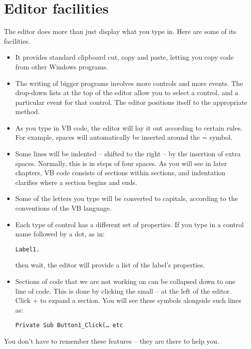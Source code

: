 	\section{Editor facilities}
		The editor does more than just display what you type in. Here are some of its facilities.
		\begin{itemize}
			\item It provides standard clipboard cut, copy and paste, letting you copy code from other Windows programs.
			\item The writing of bigger programs involves more controls and more events. The drop-down lists at the top of the editor allow you to select a control, and a particular event for that control. The editor positions itself to the appropriate method.
			\item As you type in VB code, the editor will lay it out according to certain rules. For example, spaces will automatically be inserted around the = symbol.
			\item Some lines will be indented – shifted to the right – by the insertion of extra spaces. Normally, this is in steps of four spaces. As you will see in later chapters, VB code consists of sections within sections, and indentation clarifies where a section begins and ends.
			\item Some of the letters you type will be converted to capitals, according to the conventions of the VB language.
			\item Each type of control has a different set of properties. If you type in a control name followed by a dot, as in:
				\begin{lstlisting}
Label1.
				\end{lstlisting}
				then wait, the editor will provide a list of the label’s properties.
			\item Sections of code that we are not working on can be collapsed down to one line of code. This is done by clicking the small – at the left of the editor. Click + to expand a section. You will see these symbols alongside such lines as:
				\begin{lstlisting}
Private Sub Button1_Click(… etc
				\end{lstlisting}
		\end{itemize}
		You don’t have to remember these features – they are there to help you.


